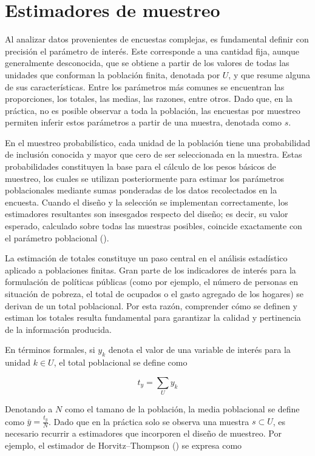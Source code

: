 \documentclass[
  spanish,
  11pt,
  letterpaper,
  oneside,
  open=any]{scrbook}
\begin{document}
\section{Estimadores de muestreo}\label{estimadores-de-muestreo}

Al analizar datos provenientes de encuestas complejas, es fundamental
definir con precisión el parámetro de interés. Este corresponde a una
cantidad fija, aunque generalmente desconocida, que se obtiene a partir
de los valores de todas las unidades que conforman la población finita,
denotada por \(U\), y que resume alguna de sus características. Entre
los parámetros más comunes se encuentran las proporciones, los totales,
las medias, las razones, entre otros. Dado que, en la práctica, no es
posible observar a toda la población, las encuestas por muestreo
permiten inferir estos parámetros a partir de una muestra, denotada como
\(s\).

En el muestreo probabilístico, cada unidad de la población tiene una
probabilidad de inclusión conocida y mayor que cero de ser seleccionada
en la muestra. Estas probabilidades constituyen la base para el cálculo
de los pesos básicos de muestreo, los cuales se utilizan posteriormente
para estimar los parámetros poblacionales mediante sumas ponderadas de
los datos recolectados en la encuesta. Cuando el diseño y la selección
se implementan correctamente, los estimadores resultantes son insesgados
respecto del diseño; es decir, su valor esperado, calculado sobre todas
las muestras posibles, coincide exactamente con el parámetro poblacional
().

La estimación de totales constituye un paso central en el análisis
estadístico aplicado a poblaciones finitas. Gran parte de los
indicadores de interés para la formulación de políticas públicas (como
por ejemplo, el número de personas en situación de pobreza, el total de
ocupados o el gasto agregado de los hogares) se derivan de un total
poblacional. Por esta razón, comprender cómo se definen y estiman los
totales resulta fundamental para garantizar la calidad y pertinencia de
la información producida.

En términos formales, si \(y_k\) denota el valor de una variable de
interés para la unidad \(k \in U\), el total poblacional se define como

\[t_y = \sum_{U} y_k\]

Denotando a \(N\) como el tamano de la población, la media poblacional
se define como \(\bar{y} = \frac{t_y}{N}\). Dado que en la práctica solo
se observa una muestra \(s \subset U\), es necesario recurrir a
estimadores que incorporen el diseño de muestreo. Por ejemplo, el
estimador de Horvitz--Thompson
() se expresa
como
\end{document}
